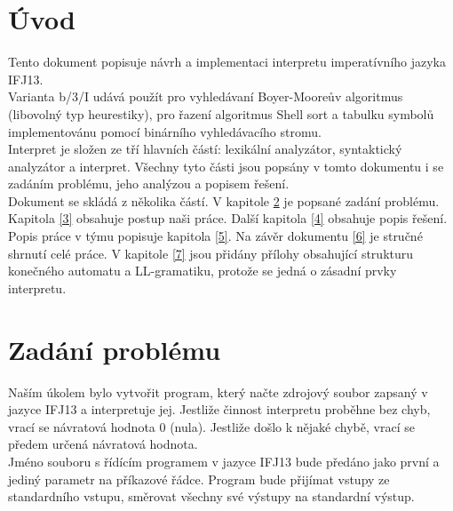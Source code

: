 \documentclass[11pt,a4paper,titlepage]{article}
\begin{document}

\thispagestyle{empty}
\pagestyle{plain}
\setcounter{page}{1}

\tableofcontents


\newpage
\pagestyle{plain}
\setcounter{page}{1}




\section{Úvod} \label{uvod}	
\bigskip
	\hspace{1cm} Tento dokument popisuje návrh a implementaci interpretu imperatívního jazyka IFJ13.\\
	Varianta b/3/I udává použít pro vyhledávaní Boyer-Mooreův algoritmus (libovolný typ heurestiky), pro řazení algoritmus Shell sort a tabulku symbolů implementovánu pomocí binárního vyhledávacího stromu. \\
	 \smallskip
	\hspace{1cm}Interpret je složen ze tří hlavních částí: lexikální analyzátor, syntaktický analyzátor a interpret. Všechny tyto části jsou popsány v tomto dokumentu i se zadáním problému, jeho analýzou a popisem řešení.\\
	\smallskip
	\hspace{1cm} Dokument se skládá z několika částí. V kapitole \ref{2} je popsané zadání problému. Kapitola \ref{3} obsahuje postup naši práce. Další kapitola \ref{4} obsahuje popis řešení. Popis práce v týmu popisuje kapitola \ref{5}.	Na závěr dokumentu \ref{6} je stručné shrnutí celé práce. V kapitole \ref{7} jsou přidány přílohy obsahující strukturu konečného automatu a LL-gramatiku, protože se jedná o zásadní prvky interpretu.                   
  \bigskip


\section{Zadání problému} \label{2}
	\bigskip
	\hspace{1cm} Naším úkolem bylo vytvořit program, který načte zdrojový soubor zapsaný v jazyce IFJ13 \newline a interpretuje jej. Jestliže činnost interpretu proběhne bez chyb, vrací se návratová hodnota 0 (nula). Jestliže došlo k nějaké chybě, vrací se předem určená návratová hodnota. \\
	\smallskip
	\hspace{1cm} Jméno souboru s řídícím programem v jazyce IFJ13 bude předáno jako první a jediný parametr na příkazové řádce. Program bude přijímat vstupy ze standardního vstupu, směrovat všechny své výstupy na standardní výstup.
  \bigskip
\end{document}
